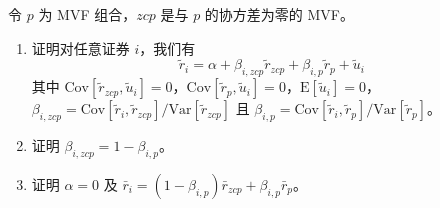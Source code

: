 \par\noindent\begin{minipage}{\linewidth}
\begin{problem}
 令 $p$ 为 MVF 组合，$zcp$ 是与 $p$ 的协方差为零的 MVF。
\begin{enumerate}[label=(\alph*)]
    \item 证明对任意证券 $i$，我们有
    \[
        \tilde{r}_{i}=\alpha+\beta_{i,zcp}\tilde{r}_{zcp}+\beta_{i,p}\tilde{r}_{p}+\tilde{u}_{i}
    \]
    其中 $\mathrm{Cov}[\tilde{r}_{zcp},\tilde{u}_{i}]=0$，$\mathrm{Cov}[\tilde{r}_{p},\tilde{u}_{i}]=0$，$\mathrm{E}[\tilde{u}_{i}]=0$，$\beta_{i,zcp}=\mathrm{Cov}[\tilde{r}_{i},\tilde{r}_{zcp}]/\mathrm{Var}[\tilde{r}_{zcp}]$ 且 $\beta_{i,p}=\mathrm{Cov}[\tilde{r}_{i},\tilde{r}_{p}]/\mathrm{Var}[\tilde{r}_{p}]$。
    \item 证明 $\beta_{i,zcp}=1-\beta_{i,p}$。
    \item 证明 $\alpha=0$ 及 $\bar{r}_{i}=(1-\beta_{i,p})\bar{r}_{zcp}+\beta_{i,p}\bar{r}_{p}$。
\end{enumerate}
\end{problem}
\end{minipage}\par
{}
